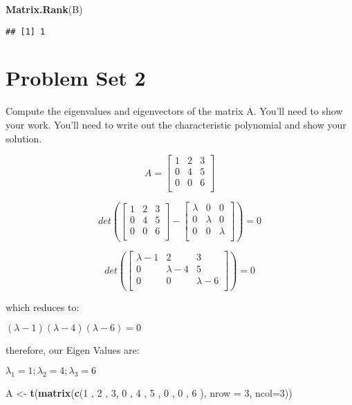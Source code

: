 \documentclass[]{article}
\newenvironment{Shaded}{\begin{snugshade}}{\end{snugshade}}
\newcommand{\KeywordTok}[1]{\textcolor[rgb]{0.13,0.29,0.53}{\textbf{{#1}}}}
\newcommand{\DataTypeTok}[1]{\textcolor[rgb]{0.13,0.29,0.53}{{#1}}}
\newcommand{\DecValTok}[1]{\textcolor[rgb]{0.00,0.00,0.81}{{#1}}}
\newcommand{\StringTok}[1]{\textcolor[rgb]{0.31,0.60,0.02}{{#1}}}
\newcommand{\NormalTok}[1]{{#1}}
\begin{document}
\begin{Shaded}
\begin{Highlighting}[]
\KeywordTok{Matrix.Rank}\NormalTok{(B)}
\end{Highlighting}
\end{Shaded}

\begin{verbatim}
## [1] 1
\end{verbatim}

\section{Problem Set 2}\label{problem-set-2}

Compute the eigenvalues and eigenvectors of the matrix A. You'll need to
show your work. You'll need to write out the characteristic polynomial
and show your solution.

\[
A = 
\begin{bmatrix}
   1 & 2 & 3 \\
   0 & 4 & 5 \\
   0 & 0 & 6 \\
\end{bmatrix}
\]

\[
det( 
\begin{bmatrix}
   1 & 2 & 3 \\
   0 & 4 & 5 \\
   0 & 0 & 6 \\
\end{bmatrix}
-
\begin{bmatrix}
   \lambda & 0 & 0 \\
   0 & \lambda  & 0 \\
   0 & 0 & \lambda  \\
\end{bmatrix}
) = 0
\]

\[
det( 
\begin{bmatrix}
   \lambda -1 & 2 & 3 \\
   0 & \lambda -4 & 5 \\
   0 & 0 & \lambda -6 \\
\end{bmatrix}
)=0
\]

which reduces to:

\((\lambda-1)(\lambda - 4)(\lambda- 6) =0\)

therefore, our Eigen Values are:

\(\lambda_1 = 1 ; \lambda_2 = 4; \lambda_3 = 6\)

\begin{Shaded}
\begin{Highlighting}[]
\NormalTok{A <-}\StringTok{  }\KeywordTok{t}\NormalTok{(}\KeywordTok{matrix}\NormalTok{(}\KeywordTok{c}\NormalTok{(}\DecValTok{1} \NormalTok{, }\DecValTok{2} \NormalTok{, }\DecValTok{3}\NormalTok{,  }\DecValTok{0} \NormalTok{, }\DecValTok{4} \NormalTok{, }\DecValTok{5} \NormalTok{, }\DecValTok{0} \NormalTok{, }\DecValTok{0} \NormalTok{, }\DecValTok{6} \NormalTok{), }\DataTypeTok{nrow =} \DecValTok{3}\NormalTok{, }\DataTypeTok{ncol=}\DecValTok{3}\NormalTok{))}
\end{Highlighting}
\end{Shaded}
\end{document}
